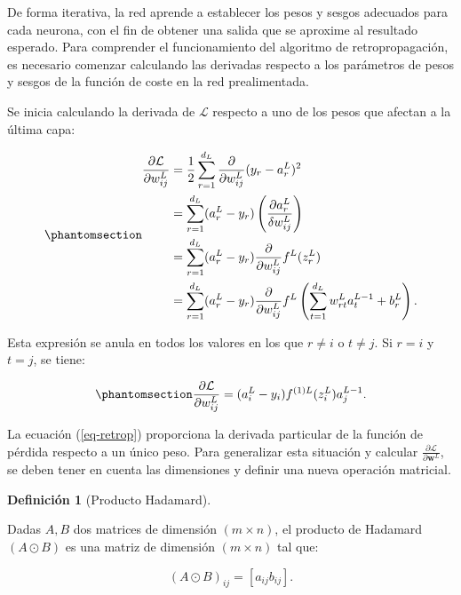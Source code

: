 \documentclass[
  us-letterpaper,
]{scrreprt}
\theoremstyle{plain}
\theoremstyle{definition}
\newtheorem{definition}{Definición}[chapter]
\theoremstyle{definition}
\theoremstyle{plain}
\theoremstyle{remark}
\begin{document}
De forma iterativa, la red aprende a establecer los pesos y sesgos
adecuados para cada neurona, con el fin de obtener una salida que se
aproxime al resultado esperado. Para comprender el funcionamiento del
algoritmo de retropropagación, es necesario comenzar calculando las
derivadas respecto a los parámetros de pesos y sesgos de la función de
coste en la red prealimentada.

Se inicia calculando la derivada de \(\mathcal L\) respecto a uno de los
pesos que afectan a la última capa:

\begin{equation}\phantomsection\label{eq-18}{\begin{split}\frac{\partial \mathcal L}{\partial w_{ij}^L} &= \frac{1}{2} \sum_{r=1}^{d_L} \frac{\partial}{\partial w_{ij}^L} (y_r - a_{r}^L)^2\\
 &= \sum_{r=1}^{d_L} (a_{r}^L - y_r) \left(\frac{\partial a_r^L}{\delta w_{ij}^L}\right)\\
 &=\sum_{r=1}^{d_L} (a_{r}^L - y_r) \frac{\partial}{\partial w_{ij}^L}f^L(z_{r}^L)\\
&= \sum_{r=1}^{d_L} (a_{r}^L - y_r) \frac{\partial}{\partial w_{ij}^L}f^L\left(\sum_{t=1}^{d_L}w_{rt}^La_t^{L-1}+b_r^L\right).\end{split}}\end{equation}

Esta expresión se anula en todos los valores en los que \(r\neq i\) o
\(t\neq j\). Si \(r = i\) y \(t = j\), se tiene:

\begin{equation}\phantomsection\label{eq-retrop}{\frac{\partial \mathcal L}{\partial w_{ij}^L} = (a_{i}^L - y_i) f^{(1)L}(z_{i}^L) a_j^{L-1}.}\end{equation}

La ecuación (\ref{eq-retrop}) proporciona la derivada particular de la
función de pérdida respecto a un único peso. Para generalizar esta
situación y calcular
\(\frac{\partial \mathcal L}{\partial \mathbf w^{L}}\), se deben tener
en cuenta las dimensiones y definir una nueva operación matricial.

\begin{definition}[Producto
Hadamard]\protect\hypertarget{def-pHada}{}\label{def-pHada}

Dadas \(A, B\) dos matrices de dimensión \((m\times n)\), el producto de
Hadamard \((A\odot B)\) es una matriz de dimensión \((m\times n)\) tal
que:

\[
(A\odot B)_{ij}=[a_{ij}b_{ij}].
\]

\end{definition}
\end{document}
